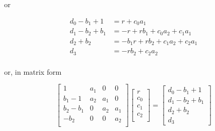 or

\begin{align*}
    d_0 - b_1 + 1   &= r + c_0a_1 \\
    d_1 - b_2 + b_1 &= -r + rb_1 +c_0a_2 + c_1a_1 \\
    d_2 + b_2       &= -b_1r + rb_2 + c_1a_2 + c_2a_1 \\
    d_3             &= - rb_2 + c_2a_2 \\
\end{align*}

or, in matrix form

\begin{equation*}
  \begin{bmatrix}
    1         & a_1 & 0   & 0   \\
    b_1 - 1   & a_2 & a_1 & 0   \\
    b_2 - b_1 & 0   & a_2 & a_1 \\
    -b_2      & 0   & 0   & a_2 \\
  \end{bmatrix}
  \begin{bmatrix}
    r   \\
    c_0 \\
    c_1 \\
    c_2 \\
  \end{bmatrix}
  =
  \begin{bmatrix}
    d_0 - b_1 + 1   \\
    d_1 - b_2 + b_1 \\
    d_2 + b_2       \\
    d_3
  \end{bmatrix}
\end{equation*}
